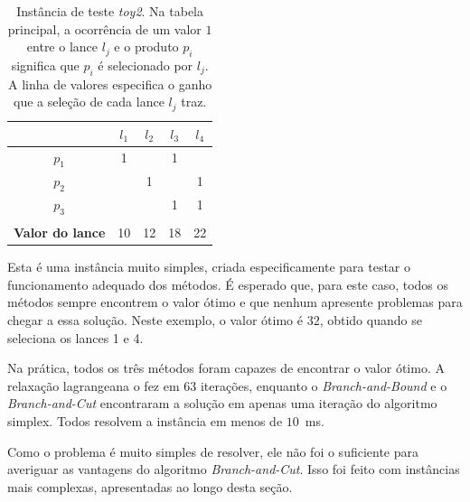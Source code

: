 \documentclass{article}
\begin{document}
	    \begin{table}[h]
	        \centering
	        \begin{tabular}{|c|c|c|c|c|}
	            \hline
	            \backslashbox{\bf Produto}{\bf Lance} & $ l_1 $ & $ l_2 $ & $ l_3 $ & $ l_4 $ \\\hline
	            $ p_1 $ & 1 & & 1 & \\\hline
	            $ p_2 $ & & 1 & & 1\\\hline
	            $ p_3 $ & & & 1 & 1 \\\hline
	            \multicolumn{5}{c}{\quad} \\\hline
	            \textbf{Valor do lance} & 10 & 12 & 18 & 22 \\\hline
	        \end{tabular}
	        \caption{Instância de teste \textit{toy2}. Na tabela principal, a ocorrência de um valor $1$ entre o lance $l_j$ e o produto $p_i$ significa que $p_i$ é selecionado por $l_j$.
	        A linha de valores especifica o ganho que a seleção de cada lance $l_j$ traz.}
	        \label{tab:toy2}
	    \end{table}
	    
	    Esta é uma instância muito simples, criada especificamente para testar o funcionamento adequado dos métodos. É esperado que, para este caso, todos os métodos sempre encontrem o valor ótimo e que nenhum apresente problemas para chegar a essa solução. Neste exemplo, o valor ótimo é $32$, obtido quando se seleciona os lances 1 e 4.
	    
	    Na prática, todos os três métodos foram capazes de encontrar o valor ótimo. A relaxação lagrangeana o fez em 63 iterações, enquanto o \emph{Branch-and-Bound} e o \emph{Branch-and-Cut} encontraram a solução em apenas uma iteração do algoritmo simplex. Todos resolvem a instância em menos de $10$~ms.
	    
	    Como o problema é muito simples de resolver, ele não foi o suficiente para averiguar as vantagens do algoritmo \emph{Branch-and-Cut}. Isso foi feito com instâncias mais complexas, apresentadas ao longo desta seção.
	    
	    
\end{document}
